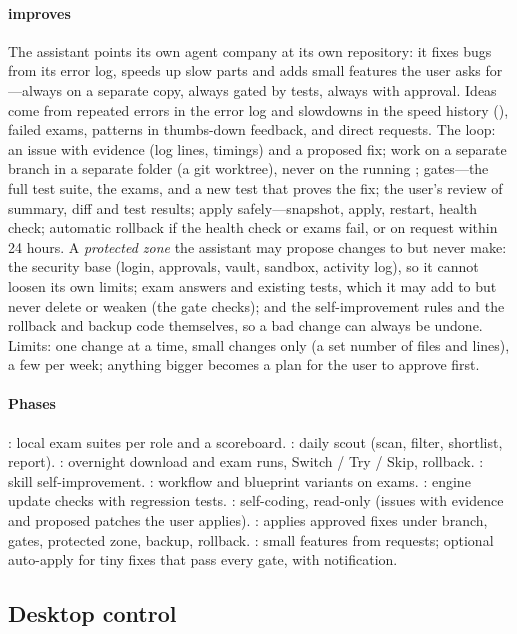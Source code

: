 \paragraph{\hivi{} improves \hivi{}} The assistant points its own agent company at its own repository: it fixes bugs from its error log, speeds up slow parts and adds small features the user asks for---always on a separate copy, always gated by tests, always with approval. Ideas come from repeated errors in the error log and slowdowns in the speed history (), failed exams, patterns in thumbs-down feedback, and direct requests. The loop: an issue with evidence (log lines, timings) and a proposed fix; work on a separate branch in a separate folder (a git worktree), never on the running \hivi{}; gates---the full test suite, the exams, and a new test that proves the fix; the user's review of summary, diff and test results; apply safely---snapshot, apply, restart, health check; automatic rollback if the health check or exams fail, or on request within 24 hours. A \emph{protected zone} the assistant may propose changes to but never make: the security base (login, approvals, vault, sandbox, activity log), so it cannot loosen its own limits; exam answers and existing tests, which it may add to but never delete or weaken (the gate checks); and the self-improvement rules and the rollback and backup code themselves, so a bad change can always be undone. Limits: one change at a time, small changes only (a set number of files and lines), a few per week; anything bigger becomes a plan for the user to approve first.

\paragraph{Phases} : local exam suites per role and a scoreboard. : daily scout (scan, filter, shortlist, report). : overnight download and exam runs, Switch / Try / Skip, rollback. : skill self-improvement. : workflow and blueprint variants on exams. : engine update checks with regression tests. : self-coding, read-only (issues with evidence and proposed patches the user applies). : applies approved fixes under branch, gates, protected zone, backup, rollback. : small features from requests; optional auto-apply for tiny fixes that pass every gate, with notification.

\subsection{Desktop control}


